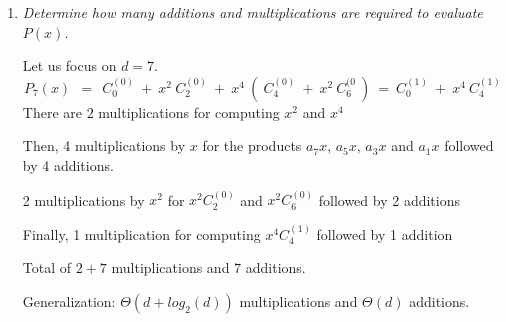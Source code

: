 \begin{itemize}
\begin{enumerate}
\item
{\em Determine how many additions and multiplications are required to evaluate $P(x)$.}

Let us focus on $d=7$.
\[
P_7(x) \ \ = \ \ C_{0}^{(0)} \ + \ x^2 \ C_2^{(0)} \ + 
\ x^4 \ ( \ C_4^{(0)} \ + \ x^2 \ C_6^{(0} \ )
\ = \ C_0^{(1)} \ + \ x^4 \ C_4^{(1)} 
\]
There are $2$ multiplications for computing $x^2$ and $x^4$

Then, 4 multiplications by $x$ for the products $a_7 x$,  $a_5 x$, $a_3 x$ and $a_1 x$
followed by 4 additions.

2 multiplications by $x^2$ for $x^2 C_2^{(0)}$ and $x^2 C_6^{(0)}$
followed by 2 additions

Finally, 1 multiplication for computing $x^4 C_4^{(1)}$
followed by 1 addition
\medskip

Total of $2 + 7$ multiplications and $7$ additions.
\medskip

Generalization: 
$\Theta(d + log_2(d))$ multiplications and $\Theta(d)$ additions.
\end{enumerate}
\end{itemize}


